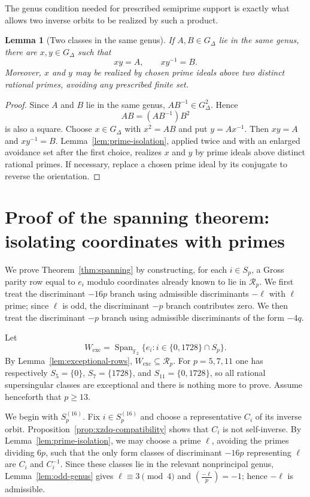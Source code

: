 \documentclass[11pt]{amsart}
\newtheorem{lemma}[theorem]{Lemma}
\theoremstyle{definition}
\theoremstyle{remark}
\newcommand{\leg}[2]{\left(\frac{#1}{#2}\right)}
\newcommand{\Rp}{\mathcal{R}_p}
\begin{document}
The genus condition needed for prescribed semiprime support is exactly what allows two inverse orbits to be realized by such a product.

\begin{lemma}[Two classes in the same genus]\label{lem:pair-realization}
If $A,B\in G_\Delta$ lie in the same genus, there are $x,y\in G_\Delta$ such that
\[
  xy=A,
  \qquad
  xy^{-1}=B.
\]
Moreover, $x$ and $y$ may be realized by chosen prime ideals above two distinct rational primes, avoiding any prescribed finite set.
\end{lemma}

\begin{proof}
Since $A$ and $B$ lie in the same genus, $AB^{-1}\in G_\Delta^2$.  Hence
\[
  AB=(AB^{-1})B^2
\]
is also a square.  Choose $x\in G_\Delta$ with $x^2=AB$ and put $y=Ax^{-1}$.  Then $xy=A$ and $xy^{-1}=B$.  Lemma~\ref{lem:prime-isolation}, applied twice and with an enlarged avoidance set after the first choice, realizes $x$ and $y$ by prime ideals above distinct rational primes.  If necessary, replace a chosen prime ideal by its conjugate to reverse the orientation.
\end{proof}


\section{Proof of the spanning theorem: isolating coordinates with primes}\label{sec:spanning-proof}

We prove Theorem~\ref{thm:spanning} by constructing, for each
$i\in S_p$, a Gross parity row equal to $e_i$ modulo coordinates already
known to lie in $\Rp$. We first treat the discriminant $-16p$ branch using
admissible discriminants $-\ell$ with $\ell$ prime; since $\ell$ is odd,
the discriminant $-p$ branch contributes zero. We then treat the
discriminant $-p$ branch using admissible discriminants of the form $-4q$.

Let
\[
W_{\mathrm{exc}}
=
\operatorname{Span}_{\mathbb F_2}
\{e_i : i\in \{0,1728\}\cap S_p\}.
\]
By Lemma~\ref{lem:exceptional-rows}, $W_{\mathrm{exc}}\subseteq\Rp$.  For $p=5,7,11$ one has respectively $S_5=\{0\}$, $S_7=\{1728\}$, and $S_{11}=\{0,1728\}$, so all rational supersingular classes are exceptional and there is nothing more to prove.  Assume henceforth that $p\ge13$.

We begin with $S_p^{(16)}$.  Fix $i\in S_p^{(16)}$ and choose a representative $C_i$ of its inverse orbit.  Proposition~\ref{prop:xzdq-compatibility} shows that $C_i$ is not self-inverse.  By Lemma~\ref{lem:prime-isolation}, we may choose a prime $\ell$, avoiding the primes dividing $6p$, such that the only form classes of discriminant $-16p$ representing $\ell$ are $C_i$ and $C_i^{-1}$.  Since these classes lie in the relevant nonprincipal genus, Lemma~\ref{lem:odd-genus} gives $\ell\equiv3\pmod4$ and $\leg{-\ell}{p}=-1$; hence $-\ell$ is admissible.
\end{document}
